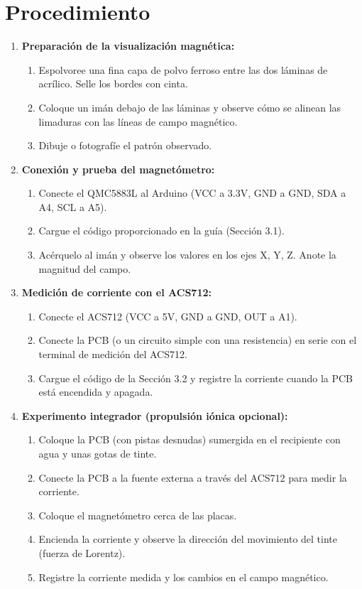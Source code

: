 \section*{Procedimiento}
\begin{enumerate}
    \item \textbf{Preparación de la visualización magnética:}
    \begin{enumerate}
        \item Espolvoree una fina capa de polvo ferroso entre las dos láminas de acrílico. Selle los bordes con cinta.
        \item Coloque un imán debajo de las láminas y observe cómo se alinean las limaduras con las líneas de campo magnético.
        \item Dibuje o fotografíe el patrón observado.
    \end{enumerate}
    \item \textbf{Conexión y prueba del magnetómetro:}
    \begin{enumerate}
        \item Conecte el QMC5883L al Arduino (VCC a 3.3V, GND a GND, SDA a A4, SCL a A5).
        \item Cargue el código proporcionado en la guía (Sección 3.1).
        \item Acérquelo al imán y observe los valores en los ejes X, Y, Z. Anote la magnitud del campo.
    \end{enumerate}
    \item \textbf{Medición de corriente con el ACS712:}
    \begin{enumerate}
        \item Conecte el ACS712 (VCC a 5V, GND a GND, OUT a A1).
        \item Conecte la PCB (o un circuito simple con una resistencia) en serie con el terminal de medición del ACS712.
        \item Cargue el código de la Sección 3.2 y registre la corriente cuando la PCB está encendida y apagada.
    \end{enumerate}
    \item \textbf{Experimento integrador (propulsión iónica opcional):}
    \begin{enumerate}
        \item Coloque la PCB (con pistas desnudas) sumergida en el recipiente con agua y unas gotas de tinte.
        \item Conecte la PCB a la fuente externa a través del ACS712 para medir la corriente.
        \item Coloque el magnetómetro cerca de las placas.
        \item Encienda la corriente y observe la dirección del movimiento del tinte (fuerza de Lorentz).
        \item Registre la corriente medida y los cambios en el campo magnético.
    \end{enumerate}
\end{enumerate}

